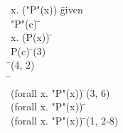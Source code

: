 \documentclass{article}
\begin{document}
\begin{proofbox}
\: \exists x. (\lnot "P"(x)) \= \hbox{given} \\
\open
\: \lnot "P"(c) \= \asm \\
\open
\: \forall x. (P(x)) \= \asm \\
\: P(c) \= \forallelim(3) \\
\: \bot \= \bottomintro(4, 2) \\
\: \bot \=  \\
\close
\: \lnot (forall x. "P"(x)) \= \notintro(3, 6) \\
\: \lnot (forall x. "P"(x)) \=  \\
\close
\: \lnot (forall x. "P"(x)) \= \existselim(1, 2-8) \\
\end{proofbox}
\end{document}
